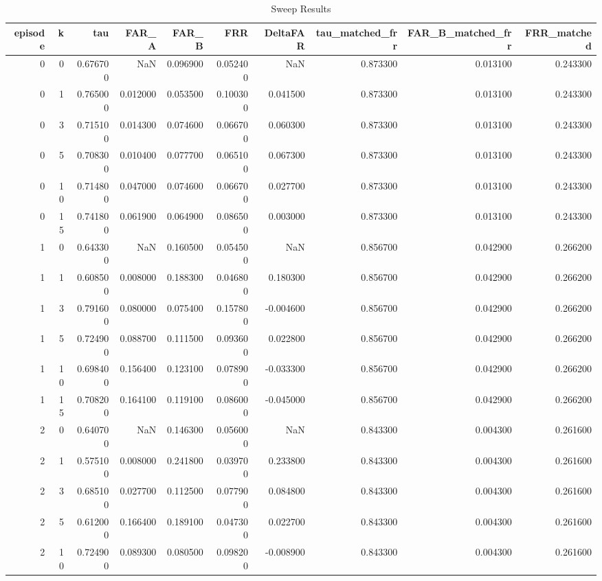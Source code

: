 \begin{table}
\caption{Sweep Results}
\label{tab_sweep_results}
\begin{tabular}{rrrrrrrrrr}
\toprule
episode & k & tau & FAR_A & FAR_B & FRR & DeltaFAR & tau_matched_frr & FAR_B_matched_frr & FRR_matched \\
\midrule
0 & 0 & 0.676700 & NaN & 0.096900 & 0.052400 & NaN & 0.873300 & 0.013100 & 0.243300 \\
0 & 1 & 0.765000 & 0.012000 & 0.053500 & 0.100300 & 0.041500 & 0.873300 & 0.013100 & 0.243300 \\
0 & 3 & 0.715100 & 0.014300 & 0.074600 & 0.066700 & 0.060300 & 0.873300 & 0.013100 & 0.243300 \\
0 & 5 & 0.708300 & 0.010400 & 0.077700 & 0.065100 & 0.067300 & 0.873300 & 0.013100 & 0.243300 \\
0 & 10 & 0.714800 & 0.047000 & 0.074600 & 0.066700 & 0.027700 & 0.873300 & 0.013100 & 0.243300 \\
0 & 15 & 0.741800 & 0.061900 & 0.064900 & 0.086500 & 0.003000 & 0.873300 & 0.013100 & 0.243300 \\
1 & 0 & 0.643300 & NaN & 0.160500 & 0.054500 & NaN & 0.856700 & 0.042900 & 0.266200 \\
1 & 1 & 0.608500 & 0.008000 & 0.188300 & 0.046800 & 0.180300 & 0.856700 & 0.042900 & 0.266200 \\
1 & 3 & 0.791600 & 0.080000 & 0.075400 & 0.157800 & -0.004600 & 0.856700 & 0.042900 & 0.266200 \\
1 & 5 & 0.724900 & 0.088700 & 0.111500 & 0.093600 & 0.022800 & 0.856700 & 0.042900 & 0.266200 \\
1 & 10 & 0.698400 & 0.156400 & 0.123100 & 0.078900 & -0.033300 & 0.856700 & 0.042900 & 0.266200 \\
1 & 15 & 0.708200 & 0.164100 & 0.119100 & 0.086000 & -0.045000 & 0.856700 & 0.042900 & 0.266200 \\
2 & 0 & 0.640700 & NaN & 0.146300 & 0.056000 & NaN & 0.843300 & 0.004300 & 0.261600 \\
2 & 1 & 0.575100 & 0.008000 & 0.241800 & 0.039700 & 0.233800 & 0.843300 & 0.004300 & 0.261600 \\
2 & 3 & 0.685100 & 0.027700 & 0.112500 & 0.077900 & 0.084800 & 0.843300 & 0.004300 & 0.261600 \\
2 & 5 & 0.612000 & 0.166400 & 0.189100 & 0.047300 & 0.022700 & 0.843300 & 0.004300 & 0.261600 \\
2 & 10 & 0.724900 & 0.089300 & 0.080500 & 0.098200 & -0.008900 & 0.843300 & 0.004300 & 0.261600 \\

\end{tabular}
\end{table}

